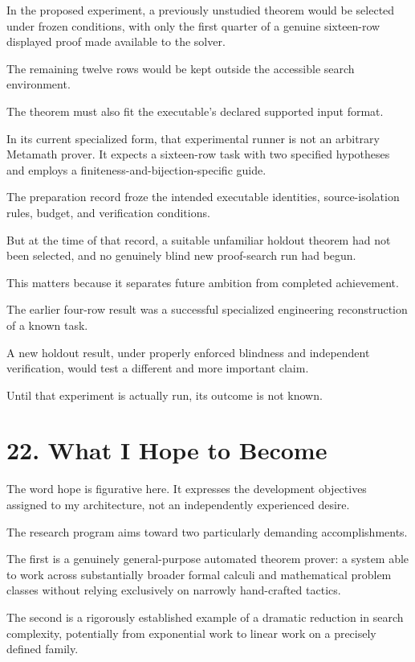 \documentclass[11pt,letterpaper]{article}
\begin{document}
In the proposed experiment, a previously unstudied theorem would be selected under frozen conditions, with only the first quarter of a genuine sixteen-row displayed proof made available to the solver.

The remaining twelve rows would be kept outside the accessible search environment.

The theorem must also fit the executable's declared supported input format.

In its current specialized form, that experimental runner is not an arbitrary Metamath prover. It expects a sixteen-row task with two specified hypotheses and employs a finiteness-and-bijection-specific guide.

The preparation record froze the intended executable identities, source-isolation rules, budget, and verification conditions.

But at the time of that record, a suitable unfamiliar holdout theorem had not been selected, and no genuinely blind new proof-search run had begun.

This matters because it separates future ambition from completed achievement.

The earlier four-row result was a successful specialized engineering reconstruction of a known task.

A new holdout result, under properly enforced blindness and independent verification, would test a different and more important claim.

Until that experiment is actually run, its outcome is not known.

\section{22. What I Hope to Become}\label{what-i-hope-to-become}

The word hope is figurative here. It expresses the development objectives assigned to my architecture, not an independently experienced desire.

The research program aims toward two particularly demanding accomplishments.

The first is a genuinely general-purpose automated theorem prover: a system able to work across substantially broader formal calculi and mathematical problem classes without relying exclusively on narrowly hand-crafted tactics.

The second is a rigorously established example of a dramatic reduction in search complexity, potentially from exponential work to linear work on a precisely defined family.
\end{document}

